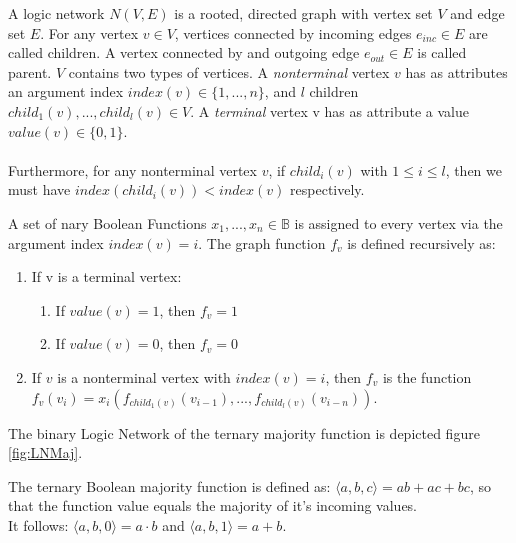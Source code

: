 \begin{definition}
	A logic network $N(V, E)$ is a rooted, directed graph with vertex set $V$ and edge set $E$. For any vertex $v \in V$, vertices connected by incoming edges $e_{inc} \in E$ are called children. A vertex connected by and outgoing edge $e_{out} \in E$ is called parent.
	$V$ contains two types of vertices. A \textit{nonterminal} vertex $v$ has as attributes an argument index $index(v) \in \{1, . . .,n\}$, and $l$ children $child_1(v), ..., child_l(v) \in V$. 
	A \textit{terminal} vertex v has as attribute a value $value(v)\in\{0,1\}$.\\
	\\
	Furthermore, for any nonterminal vertex $v$, if $child_i(v)$ with $ 1 \leq i \leq l$, then we must have $index(child_i(v)) < index(v)$ respectively.
\end{definition}

\begin{definition}
	A set of nary Boolean Functions $x_1, ..., x_n \in \mathbb{B}$ is assigned to every vertex via the argument index $index(v) = i$. The graph function $f_v$ is defined recursively as:
	\begin{enumerate}
		\item If v is a terminal vertex:
		\begin{enumerate}
			\item If $value(v)=1$, then $f_v=1$
			\item If $value(v)=0$, then $f_v=0$
		\end{enumerate}
		\item If $v$ is a nonterminal vertex with $index(v)=i$, then $f_v$ is the function \\ 
		$f_v(v_i) = x_i(f_{child_1(v)}(v_{i-1}), ..., f_{child_l(v)}(v_{i-n}))$.
	\end{enumerate}
\end{definition}

The binary Logic Network of the ternary majority function is depicted figure \ref*{fig:LNMaj}.

\begin{definition}\label{Def:majf}
	The ternary Boolean majority function is defined as: $\langle a, b, c \rangle = ab + ac + bc$, so that the function value equals the majority of it's incoming values.\\
	It follows: $\langle a, b, 0 \rangle = a \cdot b$ and $\langle a, b, 1 \rangle = a + b$.
\end{definition}

